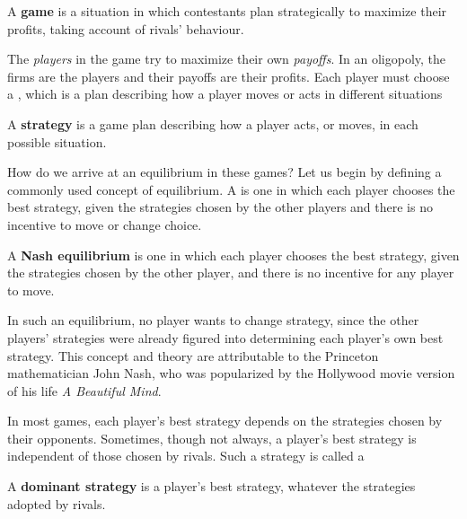 \begin{DefBox}
A \textbf{game} is a situation in which contestants plan strategically to maximize their profits, taking account of rivals' behaviour.
\end{DefBox}

The \textit{players} in the game try to maximize their own \textit{payoffs}. In an oligopoly, the firms are the players and their payoffs are their profits. Each player must choose a , which is a plan describing how a player moves or acts in different situations

\begin{DefBox}
A \textbf{strategy} is a game plan describing how a player acts, or moves, in each possible situation.
\end{DefBox}

How do we arrive at an equilibrium in these games? Let us begin by defining a commonly used concept of equilibrium. A  is one in which each player chooses the best strategy, given the strategies chosen by the other players and there is no incentive to move or change choice.

\begin{DefBox}
A \textbf{Nash equilibrium} is one in which each player chooses the best strategy, given the strategies chosen by the other player, and there is no incentive for any player to move.
\end{DefBox}

In such an equilibrium, no player wants to change strategy, since the other players' strategies were already figured into determining each player's own best strategy. This concept and theory are attributable to the Princeton mathematician John Nash, who was popularized by the Hollywood movie version of his life \textit{A Beautiful Mind}.

In most games, each player's best strategy depends on the strategies chosen by their opponents. Sometimes, though not always, a player's best strategy is independent of those chosen by rivals. Such a strategy is called a 

\begin{DefBox}
A \textbf{dominant strategy} is a player's best strategy, whatever the strategies adopted by rivals.
\end{DefBox}

